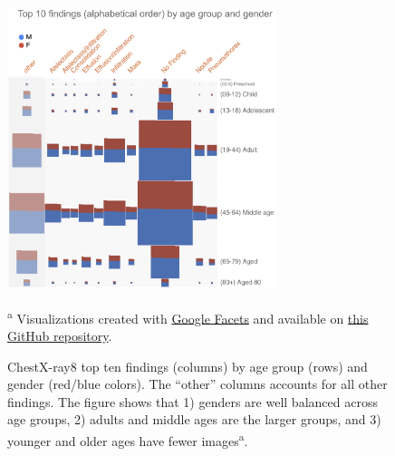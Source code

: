\begin{singlespace}


\begin{figure}[!htb]
    \centering
    \includegraphics[width=0.7\textwidth]{figures/chestX-ray8-findings-age-group-gender.png}
    \caption[ChestX-ray top ten findings by age group and gender.]{ChestX-ray8 top ten findings (columns) by age group (rows) and gender (red/blue colors). The ``other'' columns accounts for all other findings. The figure shows that 1) genders are well balanced across age groups, 2) adults and middle ages are the larger groups, and 3) younger and older ages have fewer images\textsuperscript{a}.}
    \scriptsize\textsuperscript{a} Visualizations created with \href{https://pair-code.github.io/facets/}{Google Facets} and available on \href{https://github.com/fau-masters-collected-works-cgarbin/dataset-visualization-faces-streamlit}{this GitHub repository}.
    \label{fig:chestX-ray8-findings-age-group-gender}
\end{figure}



\end{singlespace}

